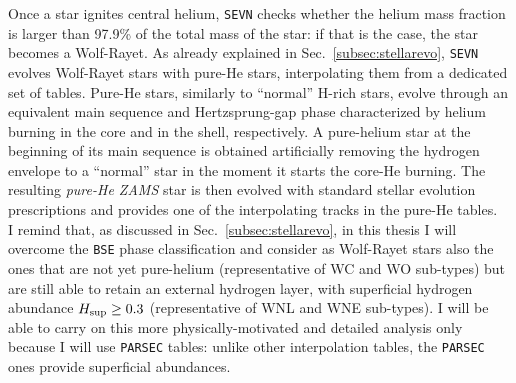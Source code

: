 \documentclass[a4paper,titlepage]{book}     	%
\begin{document}
Once a star ignites central helium, \texttt{SEVN} checks whether the helium mass fraction is larger than 97.9\% of the total mass of the star: if that is the case, the star becomes a Wolf-Rayet. As already explained in Sec.\ \ref{subsec:stellarevo}, \texttt{SEVN} evolves Wolf-Rayet stars with pure-He stars, interpolating them from a dedicated set of tables. Pure-He stars, similarly to ``normal'' H-rich stars, evolve through an equivalent main sequence and Hertzsprung-gap phase characterized by helium burning in the core and in the shell, respectively. A pure-helium star at the beginning of its main sequence is obtained artificially removing the hydrogen envelope to a ``normal'' star in the moment it starts the core-He burning. The resulting \emph{pure-He ZAMS} star is then evolved with standard stellar evolution prescriptions and provides one of the interpolating tracks in the pure-He tables.\\

I remind that, as discussed in Sec.\ \ref{subsec:stellarevo}, in this thesis I will overcome the \texttt{BSE} phase classification and consider as Wolf-Rayet stars also the ones that are not yet pure-helium (representative of WC and WO sub-types) but are still able to retain an external hydrogen layer, with superficial hydrogen abundance $H_{\rm sup} \geq 0.3$ (representative of WNL and WNE sub-types). I will be able to carry on this more physically-motivated and detailed analysis only because I will use \texttt{PARSEC} tables: unlike other interpolation tables, the \texttt{PARSEC} ones provide superficial abundances.
\end{document}
